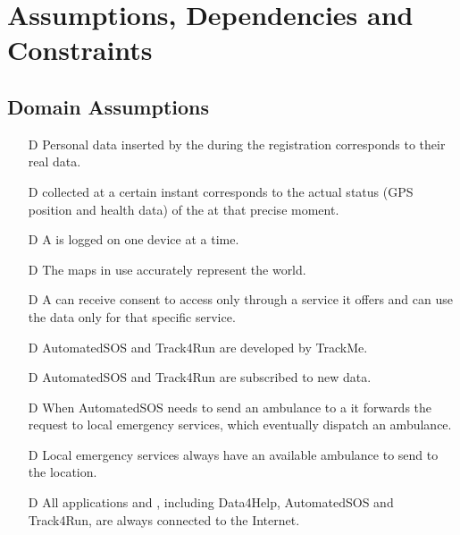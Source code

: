 \documentclass[../../rasd.tex]{subfiles}
\begin{document}
\section{Assumptions, Dependencies and Constraints}
		\subsection{Domain Assumptions}
			 	\begin{itemize}
				 	\item[D\subs{1}]Personal data inserted by the  during the registration corresponds to their real data.
					\item[D\subs{2}] collected at a certain instant corresponds to the actual status (GPS position and health data) of the  at that precise moment.				
					\item[D\subs{3}]A  is logged on one device at a time.
					\item[D\subs{4}]The maps in use accurately represent the world.
					\item[D\subs{5}]A  can receive consent to  access only through a service it offers and can use the data only for that specific service.
					\item[D\subs{6}]AutomatedSOS and Track4Run are  developed by TrackMe.
					\item[D\subs{7}]AutomatedSOS and Track4Run are subscribed to new data.
					\item[D\subs{8}]When AutomatedSOS needs to send an ambulance to a  it forwards the request to local emergency services, which eventually dispatch an ambulance.
					\item[D\subs{9}]Local emergency services always have an available ambulance to send to the  location.
					\item[D\subs{10}]All applications and , including Data4Help, AutomatedSOS and Track4Run, are always connected to the Internet.

				\end{itemize}		
\end{document}
